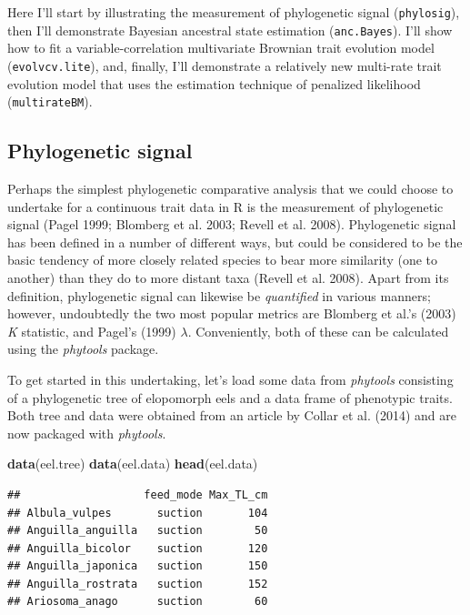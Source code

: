 \documentclass[fleqn,10pt,lineno]{wlpeerj} %
\newenvironment{Shaded}{\begin{snugshade}}{\end{snugshade}}
\newcommand{\FunctionTok}[1]{\textcolor[rgb]{0.13,0.29,0.53}{\textbf{#1}}}
\newcommand{\NormalTok}[1]{#1}
\begin{document}
Here I'll start by illustrating the measurement of phylogenetic signal (\texttt{phylosig}), then I'll demonstrate Bayesian ancestral state estimation (\texttt{anc.Bayes}). I'll show how to fit a variable-correlation multivariate Brownian trait evolution model (\texttt{evolvcv.lite}), and, finally, I'll demonstrate a relatively new multi-rate trait evolution model that uses the estimation technique of penalized likelihood (\texttt{multirateBM}).

\hypertarget{phylogenetic-signal}{%
\subsection{Phylogenetic signal}\label{phylogenetic-signal}}

Perhaps the simplest phylogenetic comparative analysis that we could choose to undertake for a continuous trait data in R is the measurement of phylogenetic signal (Pagel 1999; Blomberg et al. 2003; Revell et al. 2008). Phylogenetic signal has been defined in a number of different ways, but could be considered to be the basic tendency of more closely related species to bear more similarity (one to another) than they do to more distant taxa (Revell et al. 2008). Apart from its definition, phylogenetic signal can likewise be \emph{quantified} in various manners; however, undoubtedly the two most popular metrics are Blomberg et al.'s (2003) \emph{K} statistic, and Pagel's (1999) \(\lambda\). Conveniently, both of these can be calculated using the \emph{phytools} package.

To get started in this undertaking, let's load some data from \emph{phytools} consisting of a phylogenetic tree of elopomorph eels and a data frame of phenotypic traits. Both tree and data were obtained from an article by Collar et al. (2014) and are now packaged with \emph{phytools}.

\begin{Shaded}
\begin{Highlighting}[]
\FunctionTok{data}\NormalTok{(eel.tree)}
\FunctionTok{data}\NormalTok{(eel.data)}
\FunctionTok{head}\NormalTok{(eel.data)}
\end{Highlighting}
\end{Shaded}

\begin{verbatim}
##                   feed_mode Max_TL_cm
## Albula_vulpes       suction       104
## Anguilla_anguilla   suction        50
## Anguilla_bicolor    suction       120
## Anguilla_japonica   suction       150
## Anguilla_rostrata   suction       152
## Ariosoma_anago      suction        60
\end{verbatim}
\end{document}
